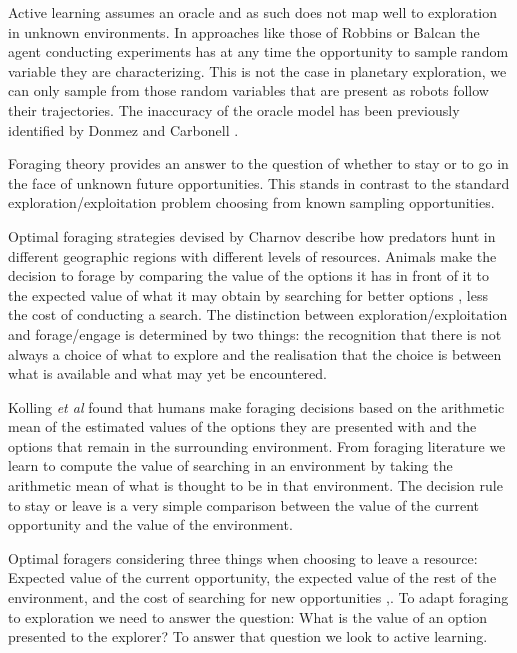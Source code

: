 

Active learning assumes an oracle and as such does not map well to exploration
in unknown environments.  In approaches like those of Robbins
\cite{robbins1952some} or Balcan \cite{balcan2006agnostic} the agent conducting
experiments has at any time the opportunity to sample random variable they
are characterizing.  This is not the case in planetary exploration, we can only
sample from those random variables that are present as robots follow their
trajectories.  The inaccuracy of the oracle model has been previously identified by Donmez and Carbonell \cite{donmez2008proactive}.

Foraging theory provides an answer to the question of whether to stay or to go
 in the face of unknown future opportunities.  This stands in contrast to the
standard exploration/exploitation problem choosing from known sampling
opportunities.

Optimal foraging strategies devised by Charnov \cite{charnov1976optimal}
describe how predators hunt in different geographic regions with different
levels of resources.  Animals make the decision to forage by comparing the
value of the options it has in front of it to the expected value of what it may
obtain by searching for better options \cite{kolling2012neural}, less the cost
of conducting a search.  The distinction between exploration/exploitation and
forage/engage is determined by two things: the recognition that there is not
always a choice of what to explore and the realisation that the choice is
between what is available and what may yet be encountered.  

Kolling \emph{et al} \cite{kolling2012neural} found that humans make foraging
decisions based on the arithmetic mean of the estimated values of the
options they are presented with and the options that remain in the surrounding
environment.  From foraging literature we learn to compute the value of
searching in an environment by taking the arithmetic mean of what is thought to
be in that environment.  The decision rule to stay or leave is a very simple
comparison between the value of the current opportunity and the value of the
environment.

Optimal foragers considering three things when choosing to leave a resource:
Expected value of the current opportunity, the expected value of the rest of
the environment, and the cost of searching for new opportunities
\cite{charnov1976optimal},\cite{kolling2012neural}.  To adapt foraging to
exploration we need to answer the question: What is the value of
an option presented to the explorer?  To answer that question we look to active
learning.

